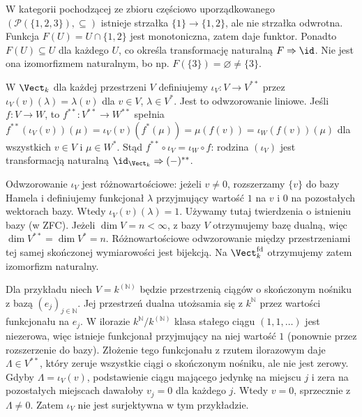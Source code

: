 \begin{przyklad}
W kategorii pochodzącej ze zbioru częściowo uporządkowanego $(\mathcal P(\{1,2,3\}),\subseteq)$ istnieje strzałka $\{1\}\to\{1,2\}$, ale nie strzałka odwrotna. Funkcja $F(U)=U\cap\{1,2\}$ jest monotoniczna, zatem daje funktor. Ponadto $F(U)\subseteq U$ dla każdego $U$, co określa transformację naturalną $F\Rightarrow\id$. Nie jest ona izomorfizmem naturalnym, bo np. $F(\{3\})=\varnothing\neq\{3\}$.
\end{przyklad}

\begin{przyklad}\label{przyklad:podwojny-dual}
W $\Vect_k$ dla każdej przestrzeni $V$ definiujemy $\iota_V:V\to V^{**}$ przez $\iota_V(v)(\lambda)=\lambda(v)$ dla $v\in V$, $\lambda\in V^*$. Jest to odwzorowanie liniowe. Jeśli $f:V\to W$, to $f^{**}:V^{**}\to W^{**}$ spełnia
$f^{**}(\iota_V(v))(\mu)=\iota_V(v)(f^*(\mu))=\mu(f(v))=\iota_W(f(v))(\mu)$
dla wszystkich $v\in V$ i $\mu\in W^*$. Stąd $f^{**}\circ\iota_V=\iota_W\circ f$: rodzina $(\iota_V)$ jest transformacją naturalną $\id_{\Vect_k}\Rightarrow(-)^{**}$.

Odwzorowanie $\iota_V$ jest różnowartościowe: jeżeli $v\ne0$, rozszerzamy $\{v\}$ do bazy Hamela i definiujemy funkcjonał $\lambda$ przyjmujący wartość $1$ na $v$ i $0$ na pozostałych wektorach bazy. Wtedy $\iota_V(v)(\lambda)=1$. Używamy tutaj twierdzenia o istnieniu bazy (w ZFC). Jeżeli $\dim V=n<\infty$, z bazy $V$ otrzymujemy bazę dualną, więc $\dim V^{**}=\dim V^*=n$. Różnowartościowe odwzorowanie między przestrzeniami tej samej skończonej wymiarowości jest bijekcją. Na $\Vect_k^{\mathrm{fd}}$ otrzymujemy zatem izomorfizm naturalny.

Dla przykładu niech $V=k^{(\mathbb N)}$ będzie przestrzenią ciągów o skończonym nośniku z bazą $(e_j)_{j\in\mathbb N}$. Jej przestrzeń dualna utożsamia się z $k^{\mathbb N}$ przez wartości funkcjonału na $e_j$. W ilorazie $k^{\mathbb N}/k^{(\mathbb N)}$ klasa stałego ciągu $(1,1,\ldots)$ jest niezerowa, więc istnieje funkcjonał przyjmujący na niej wartość $1$ (ponownie przez rozszerzenie do bazy). Złożenie tego funkcjonału z rzutem ilorazowym daje $\Lambda\in V^{**}$, który zeruje wszystkie ciągi o skończonym nośniku, ale nie jest zerowy. Gdyby $\Lambda=\iota_V(v)$, podstawienie ciągu mającego jedynkę na miejscu $j$ i zera na pozostałych miejscach dawałoby $v_j=0$ dla każdego $j$. Wtedy $v=0$, sprzecznie z $\Lambda\ne0$. Zatem $\iota_V$ nie jest surjektywna w tym przykładzie.
\end{przyklad}

